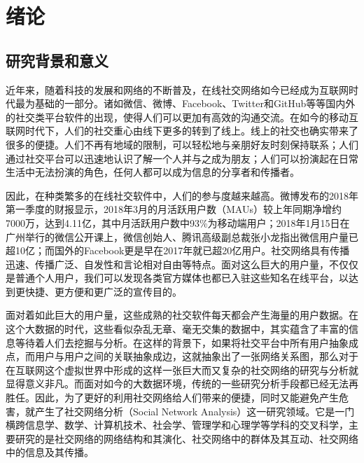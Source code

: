 \chapter{绪论}
\section{研究背景和意义}
近年来，随着科技的发展和网络的不断普及，在线社交网络如今已经成为互联网时代最为基础的一部分。诸如微信、微博、Facebook、Twitter和GitHub等等国内外的社交类平台软件的出现，使得人们可以更加有高效的沟通交流。在如今的移动互联网时代下，人们的社交重心由线下更多的转到了线上。线上的社交也确实带来了很多的便捷。人们不再有地域的限制，可以轻松地与亲朋好友时刻保持联系；人们通过社交平台可以迅速地认识了解一个人并与之成为朋友；人们可以扮演起在日常生活中无法扮演的角色，任何人都可以成为信息的分享者和传播者。

因此，在种类繁多的在线社交软件中，人们的参与度越来越高。微博发布的2018年第一季度的财报显示，2018年3月的月活跃用户数（MAUs）较上年同期净增约7000万，达到4.11亿，其中月活跃用户数中93\%为移动端用户；2018年1月15日在广州举行的微信公开课上，微信创始人、腾讯高级副总裁张小龙指出微信用户量已超10亿；而国外的Facebook更是早在2017年就已超20亿用户。社交网络具有传播迅速、传播广泛、自发性和言论相对自由等特点。面对这么巨大的用户量，不仅仅是普通个人用户，我们可以发现各类官方媒体也都已入驻这些知名在线平台，以达到更快捷、更方便和更广泛的宣传目的。

面对着如此巨大的用户量，这些成熟的社交软件每天都会产生海量的用户数据。在这个大数据的时代，这些看似杂乱无章、毫无交集的数据中，其实蕴含了丰富的信息等待着人们去挖掘与分析。在这样的背景下，如果将社交平台中所有用户抽象成点，而用户与用户之间的关联抽象成边，这就抽象出了一张网络关系图，那么对于在互联网这个虚拟世界中形成的这样一张巨大而又复杂的社交网络的研究与分析就显得意义非凡。而面对如今的大数据环境，传统的一些研究分析手段都已经无法再胜任。因此，为了更好的利用社交网络给人们带来的便捷，同时又能避免产生危害，就产生了社交网络分析（Social Network Analysis）这一研究领域。它是一门横跨信息学、数学、计算机技术、社会学、管理学和心理学等学科的交叉科学，主要研究的是社交网络的网络结构和其演化、社交网络中的群体及其互动、社交网络中的信息及其传播。

